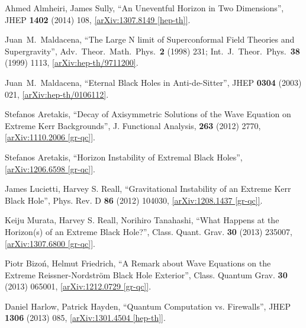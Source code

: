 \documentclass[12pt]{article}
\newcommand{\2}{$^2$}
\newcommand{\3}{$^3$}
\newcommand{\4}{$_4$}
\newcommand{\5}{$_5$}
\begin{document}
\begin{thebibliography}{400}
Ahmed Almheiri, James Sully, ``An Uneventful Horizon in Two Dimensions'',
  JHEP {\bf 1402} (2014) 108, \href{http://arxiv.org/abs/1307.8149}{
  [arXiv:1307.8149 [hep-th]]}.

  Juan~M.~Maldacena,
  ``The Large N limit of Superconformal Field Theories and Supergravity'',
  Adv.\ Theor.\ Math.\ Phys.\  {\bf 2} (1998) 231;  Int.\ J.\ Theor.\ Phys.\  {\bf 38} (1999) 1113,
 \href{http://arxiv.org/abs/hep-th/9711200}{[arXiv:hep-th/9711200]}.

  Juan~M.~Maldacena,
  ``Eternal Black Holes in Anti-de-Sitter'',
  JHEP {\bf 0304} (2003) 021, \href{http://arxiv.org/abs/hep-th/0106112}{
  [arXiv:hep-th/0106112]}.







Stefanos Aretakis, ``Decay of Axisymmetric Solutions of the Wave Equation on Extreme Kerr Backgrounds'', J. Functional Analysis, \textbf{263} (2012) 2770, \href{http://arxiv.org/abs/1110.2006}{[arXiv:1110.2006 [gr-qc]]}.

Stefanos Aretakis, ``Horizon Instability of Extremal Black Holes'', \href{http://arxiv.org/abs/1206.6598}{[arXiv:1206.6598 [gr-qc]]}.

James Lucietti, Harvey S. Reall, ``Gravitational Instability of an Extreme Kerr Black Hole'', Phys. Rev. D \textbf{86} (2012) 104030, \href{http://arxiv.org/abs/1208.1437}{[arXiv:1208.1437 [gr-qc]]}.

Keiju Murata, Harvey S. Reall, Norihiro Tanahashi, ``What Happens at the Horizon(s) of an Extreme Black Hole?'', Class. Quant. Grav. \textbf{30} (2013) 235007, \href{http://arxiv.org/abs/1307.6800}{[arXiv:1307.6800 [gr-qc]]}.

Piotr Bizo\'n, Helmut Friedrich, ``A Remark about Wave Equations on the Extreme Reissner-Nordström Black Hole Exterior'', Class. Quantum Grav. \textbf{30} (2013) 065001, \href{http://arxiv.org/abs/1212.0729}{[arXiv:1212.0729 [gr-qc]]}.

Daniel Harlow, Patrick Hayden, ``Quantum Computation vs. Firewalls'', JHEP \textbf{1306} (2013) 085, \href{http://arxiv.org/abs/1301.4504}{[arXiv:1301.4504 [hep-th]]}.


\end{thebibliography}
\end{document}
